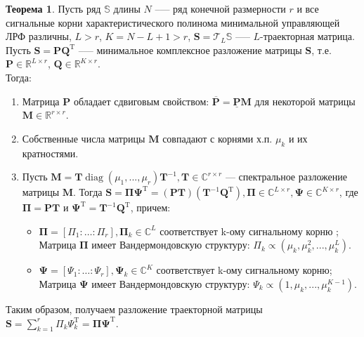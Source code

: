 \documentclass[specialist, substylefile = spbureport.rtx, subf,href,colorlinks=true, 12pt]{disser}
\theoremstyle{definition}
\newtheorem{theorem}{Теорема}
\DeclareMathOperator{\diag}{diag}
\begin{document}
\begin{theorem}
\label{th1}
Пусть ряд $\mathbb{S}$ длины $N$ --— ряд конечной размерности $r$ и все сигнальные корни характеристического полинома минимальной управляющей ЛРФ различны, $L > r$, $K = N - L + 1 > r$, $\mathbf{S} = \mathcal{T}_L\mathbb{S}$ --— $L$-траекторная матрица. Пусть $\mathbf{S} = \mathbf{P Q}^{\mathrm{T}}$ --— минимальное комплексное разложение матрицы $\mathbf{S}$, т.е. $\mathbf{P} \in \mathbb{R}^{L \times r}$, $\mathbf{Q} \in \mathbb{R}^{K \times r}$. \\
    \hspace*{0.5cm} Тогда:
    \begin{enumerate}
        \item Матрица $\mathbf{P}$ обладает сдвиговым свойством: $\overline{\mathbf{P}} = \underline{\mathbf{P}}\mathbf{M}$ для некоторой матрицы $\mathbf{M} \in \mathbb{R}^{r \times r}$.
        \item Собственные числа матрицы $\mathbf{M}$ совпадают с корнями х.п. $\mu_k$ и их кратностями.
        \item Пусть $\mathbf{M} = \mathbf{T}\diag (\mu_1, ..., \mu_r)\mathbf{T}^{-1}, \mathbf{T} \in \mathbb{C}^{r \times r}$ --- спектральное разложение матрицы $\mathbf{M}$.
        Тогда $\mathbf{S} = \mathbf{\Pi \Psi}^{\mathrm{T}} = (\mathbf{PT})(\mathbf{T}^{-1}\mathbf{ Q}^{\mathrm{T}}), \mathbf{\Pi} \in \mathbb{C}^{L \times r}, \mathbf{\Psi} \in \mathbb{C}^{K \times r}$, где $\mathbf{\Pi} = \mathbf{PT}$ и $\mathbf{\Psi}^{\mathrm{T}} = \mathbf{T}^{-1}\mathbf{Q}^{\mathrm{T}}$, причем:
        \begin{itemize}
            \item $\mathbf{\Pi} = [\Pi_1: \ldots :\Pi_r], \mathbf{\Pi}_k \in \mathbb{C}^{L}$ соответствует k-ому сигнальному корню ; Матрица $\mathbf{\Pi}$ имеет Вандермондовскую структуру: $\Pi_k \propto (\mu_k, \mu_k^2, ..., \mu_k^L)$.

            \item $\mathbf{\Psi} = [\Psi_1: \ldots :\Psi_r], \mathbf{\Psi}_k \in \mathbb{C}^{K}$ соответствует k-ому сигнальному корню; Матрица $\mathbf{\Psi}$ имеет Вандермондовскую структуру: $\Psi_k \propto (1, \mu_k, ..., \mu_k^{K - 1})$.
        \end{itemize}
    \end{enumerate}

\end{theorem}
Таким образом, получаем разложение траекторной матрицы $\mathbf{S} = \sum^r_{k=1} \Pi_k\Psi_k^{\mathrm{T}} = \mathbf{\Pi \Psi}^{\mathrm{T}}$.
\end{document}

